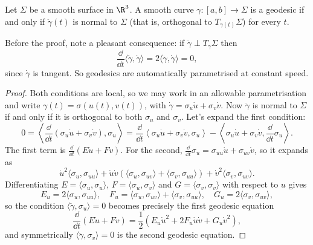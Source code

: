 \begin{proposition}\label{prop:geodesicnormal}
    Let $\Sigma$ be a smooth surface in $\R^3$. A smooth curve $\gamma : [a, b] \rightarrow \Sigma$ is a geodesic if and only if $\ddot{\gamma}(t)$ is normal to $\Sigma$ (that is, orthogonal to $T_{\gamma(t)}\Sigma$) for every $t$.
\end{proposition}

\begin{remark}
    Before the proof, note a pleasant consequence: if $\ddot\gamma \perp T_\gamma \Sigma$ then
    $$
    \frac{\dd}{\dd t}\langle \dot\gamma, \dot\gamma \rangle = 2 \langle \ddot \gamma, \dot\gamma \rangle = 0,
    $$
    since $\dot\gamma$ is tangent. So geodesics are automatically parametrised at constant speed.
\end{remark}
\begin{proof}
    Both conditions are local, so we may work in an allowable parametrisation and write $\gamma(t) = \sigma(u(t), v(t))$, with $\dot\gamma = \sigma_u \dot u + \sigma_v \dot v$. Now $\ddot\gamma$ is normal to $\Sigma$ if and only if it is orthogonal to both $\sigma_u$ and $\sigma_v$. Let's expand the first condition:
    $$
    0 = \left\langle \frac{\dd}{\dd t}\left(\sigma_u \dot u + \sigma_v \dot v\right), \sigma_u \right\rangle = \frac{\dd}{\dd t}\left\langle \sigma_u \dot u + \sigma_v \dot v, \sigma_u \right\rangle - \left\langle \sigma_u \dot u + \sigma_v \dot v, \frac{\dd}{\dd t}\sigma_u \right\rangle.
    $$
    The first term is $\frac{\dd}{\dd t}(E \dot u + F \dot v)$. For the second, $\frac{\dd}{\dd t}\sigma_u = \sigma_{uu}\dot u + \sigma_{uv} \dot v$, so it expands as
    $$
    \dot u^2 \langle \sigma_u, \sigma_{uu}\rangle + \dot u \dot v \left(\langle \sigma_u, \sigma_{uv}\rangle + \langle \sigma_v, \sigma_{uu} \rangle\right) + \dot v^2 \langle \sigma_v, \sigma_{uv} \rangle.
    $$
    Differentiating $E = \langle \sigma_u, \sigma_u\rangle$, $F = \langle \sigma_u, \sigma_v \rangle$ and $G = \langle \sigma_v, \sigma_v\rangle$ with respect to $u$ gives
    $$
    E_u = 2\langle \sigma_u, \sigma_{uu}\rangle, \quad F_u = \langle \sigma_u, \sigma_{uv}\rangle + \langle \sigma_v, \sigma_{uu} \rangle, \quad G_u = 2 \langle \sigma_v, \sigma_{uv}\rangle,
    $$
    so the condition $\langle \ddot\gamma, \sigma_u \rangle = 0$ becomes precisely the first geodesic equation
    $$
    \frac{\dd}{\dd t}(E \dot u + F \dot v) = \frac{1}{2}\left(E_u \dot u^2 + 2F_u \dot u \dot v + G_u \dot v^2\right),
    $$
    and symmetrically $\langle \ddot \gamma, \sigma_v \rangle = 0$ is the second geodesic equation.
\end{proof}

